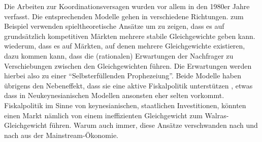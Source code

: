 Die Arbeiten zur Koordinationsversagen wurden vor allem in den 1980er Jahre verfasst. Die entsprechenden Modelle gehen in verschiedene Richtungen. \textcite{Cooper1988} zum Beispiel verwenden spieltheoretische Ansätze um zu zeigen, dass es auf grundsätzlich kompetitiven Märkten mehrere stabile Gleichgewichte geben kann. \textcite{Woodford1990, Woodford1990b} wiederum, dass es auf Märkten, auf denen mehrere Gleichgewichte existieren, dazu kommen kann, dass die (rationalen) Erwartungen der Nachfrager zu Verschiebungen zwischen den Gleichgewichten führen. Die Erwartungen werden hierbei also zu einer "`Selbsterfüllenden Prophezeiung"'. Beide Modelle haben übrigens den Nebeneffekt, dass sie eine aktive Fiskalpolitik unterstützen \parencite[S. 16]{RomerDavid1993}, etwas dass in Neukeynesianischen Modellen ansonsten eher selten vorkommt. Fiskalpolitik im Sinne von keynesianischen, staatlichen Investitionen, könnten einen Markt nämlich von einem ineffizienten Gleichgewicht zum Walras-Gleichgewicht führen. Warum auch immer, diese Ansätze verschwanden nach und nach aus der Mainstream-Ökonomie. 

